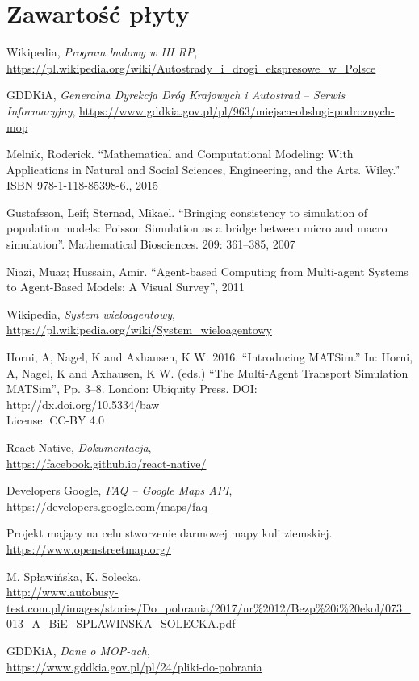 \chapter{Zawartość płyty}

\begin{thebibliography}{99}

 Wikipedia, \textit{Program budowy w III RP},\\ \url{https://pl.wikipedia.org/wiki/Autostrady\_i\_drogi\_ekspresowe\_w\_Polsce}

 GDDKiA, \textit{Generalna Dyrekcja Dróg Krajowych i Autostrad -- Serwis Informacyjny}, \url{https://www.gddkia.gov.pl/pl/963/miejsca-obslugi-podroznych-mop}

Melnik, Roderick. ``Mathematical and Computational Modeling: With Applications in Natural and Social Sciences, Engineering, and the Arts. Wiley.'' ISBN 978-1-118-85398-6., 2015

Gustafsson, Leif; Sternad, Mikael. ``Bringing consistency to simulation of population models: Poisson Simulation as a bridge between micro and macro simulation''. Mathematical Biosciences. 209: 361–385, 2007

 Niazi, Muaz; Hussain, Amir. ``Agent-based Computing from Multi-agent Systems to Agent-Based Models: A Visual Survey'', 2011

 Wikipedia, \textit{System wieloagentowy},\\ \url{https://pl.wikipedia.org/wiki/System_wieloagentowy}

 Horni, A, Nagel, K and Axhausen, K W. 2016. ``Introducing MATSim.'' In: Horni, A, Nagel, K and
Axhausen, K W. (eds.) ``The Multi-Agent Transport Simulation MATSim'', Pp. 3–8. London: Ubiquity Press. DOI: http://dx.doi.org/10.5334/baw \\ License: CC-BY 4.0

 React Native, \textit{Dokumentacja}, \\ \url{https://facebook.github.io/react-native/}

 Developers Google, \textit{FAQ -- Google Maps API},\\ \url{https://developers.google.com/maps/faq}

  Projekt mający na celu stworzenie darmowej mapy kuli
  ziemskiej. \url{https://www.openstreetmap.org/} 

 M. Spławińska, K. Solecka, \\
\url{http://www.autobusy-test.com.pl/images/stories/Do_pobrania/2017/nr%2012/Bezp%20i%20ekol/073_013_A_BiE_SPLAWINSKA_SOLECKA.pdf} 

 GDDKiA, \textit{Dane o MOP-ach}, \\ \url{https://www.gddkia.gov.pl/pl/24/pliki-do-pobrania}
\end{thebibliography}




